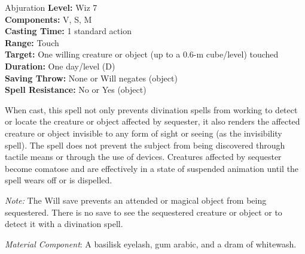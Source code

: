 {Abjuration}
{
	\textbf{Level:}
	Wiz 7\\
	\textbf{Components:}
	V, S, M\\
	\textbf{Casting Time:}
	1 standard action\\
	\textbf{Range:}
	Touch\\
	\textbf{Target:}
	One willing creature or object (up to a 0.6-m cube/level) touched\\
	\textbf{Duration:}
	One day/level (D)\\
	\textbf{Saving Throw:}
	None or Will negates (object)\\
	\textbf{Spell Resistance:}
	No or Yes (object)\\
}
{
	When cast, this spell not only prevents divination spells from working to detect or locate the creature or object affected by sequester, it also renders the affected creature or object invisible to any form of sight or seeing (as the invisibility spell). The spell does not prevent the subject from being discovered through tactile means or through the use of devices. Creatures affected by sequester become comatose and are effectively in a state of suspended animation until the spell wears off or is dispelled.

	\textit{Note:} The Will save prevents an attended or magical object from being sequestered. There is no save to see the sequestered creature or object or to detect it with a divination spell.

	\textit{Material Component}:
	A basilisk eyelash, gum arabic, and a dram of whitewash.

}
